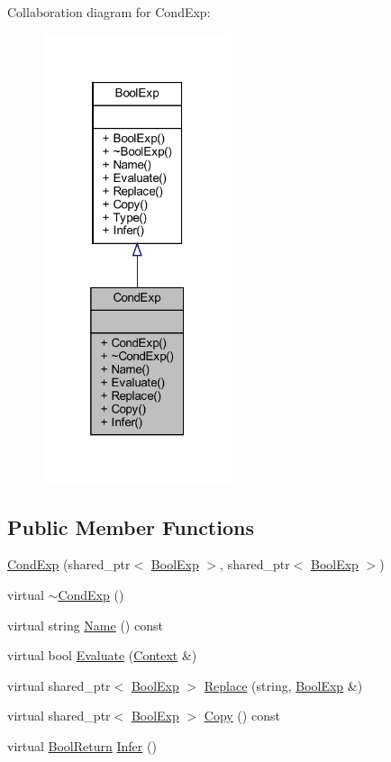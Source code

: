 Collaboration diagram for Cond\+Exp\+:
\nopagebreak
\begin{figure}[H]
\begin{center}
\leavevmode
\includegraphics[width=157pt]{classCondExp__coll__graph}
\end{center}
\end{figure}
\subsection*{Public Member Functions}
\begin{DoxyCompactItemize}
\item 
\mbox{\hyperlink{classCondExp_a7c531f5e34f68fc5d5436a0a521de0b5}{Cond\+Exp}} (shared\+\_\+ptr$<$ \mbox{\hyperlink{classBoolExp}{Bool\+Exp}} $>$, shared\+\_\+ptr$<$ \mbox{\hyperlink{classBoolExp}{Bool\+Exp}} $>$)
\item 
virtual \mbox{\hyperlink{classCondExp_aad96be2ad7ce013bc05dfc77f541bf24}{$\sim$\+Cond\+Exp}} ()
\item 
virtual string \mbox{\hyperlink{classCondExp_a556da724a343a45e1bab5da0a3f8a091}{Name}} () const
\item 
virtual bool \mbox{\hyperlink{classCondExp_a36c86af1adba98b0ab7d15fa53e4027f}{Evaluate}} (\mbox{\hyperlink{classContext}{Context}} \&)
\item 
virtual shared\+\_\+ptr$<$ \mbox{\hyperlink{classBoolExp}{Bool\+Exp}} $>$ \mbox{\hyperlink{classCondExp_a0bbcb0b6822b47bee1baa09d7c88f4d0}{Replace}} (string, \mbox{\hyperlink{classBoolExp}{Bool\+Exp}} \&)
\item 
virtual shared\+\_\+ptr$<$ \mbox{\hyperlink{classBoolExp}{Bool\+Exp}} $>$ \mbox{\hyperlink{classCondExp_a07dc28d880912ea9553c75ebf26431e8}{Copy}} () const
\item 
virtual \mbox{\hyperlink{structBoolReturn}{Bool\+Return}} \mbox{\hyperlink{classCondExp_a3824041035f12f58e583181b57491668}{Infer}} ()
\end{DoxyCompactItemize}


